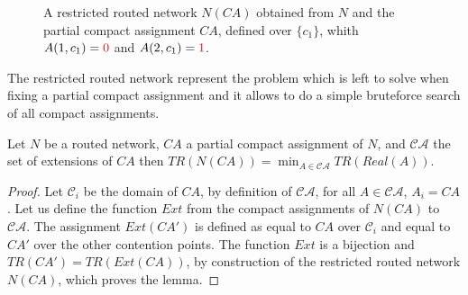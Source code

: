 \begin{figure}
\begin{center}
{
}

 \caption{A restricted routed network $N(CA)$ obtained from $N$ and the partial compact assignment $CA$, defined over $\{c_1\}$, whith $A(1,c_1) = \textcolor{red}{0}$ and $A(2,c_1) = \textcolor{red}{1}$.}

\label{fig:randomnetworks}
\end{center}
\end{figure}

The restricted routed network represent the problem which is left to solve 
when fixing a partial compact assignment and it allows to do a simple bruteforce search
of all compact assignments.

\begin{lemma}\label{lemma:restriction}
Let $N$ be a routed network, $CA$ a partial compact assignment of $N$, and $\mathcal{CA}$
the set of extensions of $CA$ then $TR(N(CA)) = \min_{ A \in \mathcal{CA}} TR(Real(A))$.
\end{lemma}
\begin{proof}
Let $\mathcal{C}_i$ be the domain of $CA$, by definition of $\mathcal{CA}$, 
for all $A \in \mathcal{CA}$, $A_i = CA$. Let us define the function $Ext$ from the
compact assignments of $N(CA)$ to $\mathcal{CA}$. The assignment $Ext(CA')$ is 
defined as equal to $CA$ over $\mathcal{C}_i$ and equal to $CA'$ over the other contention points.
The function $Ext$ is a bijection and $TR(CA') = TR(Ext(CA))$, by construction of the restricted routed network
$N(CA)$, which proves the lemma.
\end{proof}

